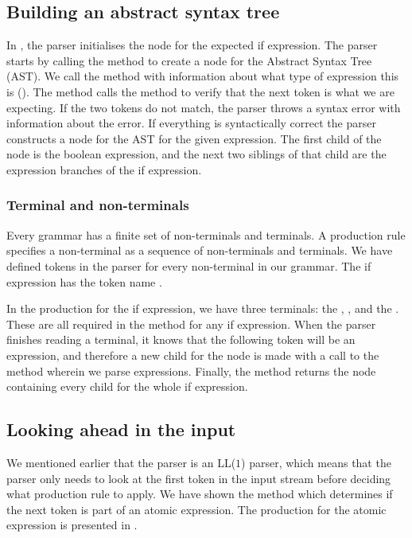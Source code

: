\subsection{Building an abstract syntax tree}
In , the parser initialises the node for the
expected if expression. The parser starts by calling the method
 to create a node for the Abstract Syntax Tree (AST).
We call the method with information about what type of expression this
is (). The method calls the  method
to verify that the next token is what we are expecting. If the two
tokens do not match, the parser throws a syntax error with information
about the error. If everything is syntactically correct the parser
constructs a node for the AST for the given expression. The first child
of the node is the boolean expression, and the next two siblings of that
child are the expression branches of the if expression.

\subsubsection{Terminal and non-terminals}
Every grammar has a finite set of non-terminals and terminals. 
A production rule specifies a non-terminal as a sequence of non-terminals and terminals. 
We have defined tokens in the
parser for every non-terminal in our grammar. The if expression has the
token name .

In the production for the if expression, we have three terminals: the ,
, and the . These are all required in the method for any
if expression. When the parser finishes reading a terminal, it knows that the
following token will be an expression, and therefore a new child for the node is
made with a call to the  method wherein we parse
expressions. Finally, the method returns the node containing every child for the
whole if expression.

\subsection{Looking ahead in the input}
We mentioned earlier that the parser is an LL($1$) parser, which means that the
parser only needs to look at the first token in the input stream before deciding
what production rule to apply.  We have shown the 
method which determines if the next token is part of an atomic expression. The
production for the atomic expression is presented in
.

